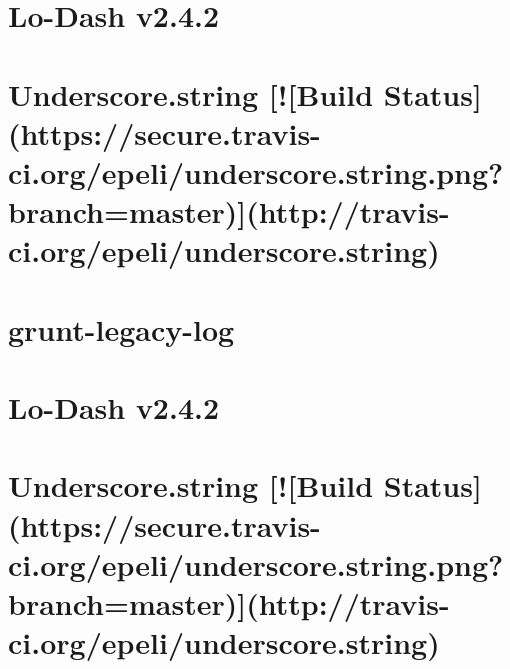 \documentclass[twoside]{book}
\newcommand{\+}{\discretionary{\mbox{\scriptsize$\hookleftarrow$}}{}{}}
\begin{document}
\chapter{Lo-\/\+Dash v2.4.2}
\label{md_app_web_node_modules_grunt-legacy-log_node_modules_lodash__r_e_a_d_m_e}

\chapter{Underscore.\+string \mbox{[}!\mbox{[}Build Status\mbox{]}(https\+://secure.travis-\/ci.org/epeli/underscore.string.\+png?branch=master)\mbox{]}(http\+://travis-\/ci.org/epeli/underscore.string)}
\label{md_app_web_node_modules_grunt-legacy-log_node_modules_underscore_8string__r_e_a_d_m_e}

\chapter{grunt-\/legacy-\/log}
\label{md_app_web_node_modules_grunt-legacy-log__r_e_a_d_m_e}

\chapter{Lo-\/\+Dash v2.4.2}
\label{md_app_web_node_modules_grunt-legacy-log-utils_node_modules_lodash__r_e_a_d_m_e}

\chapter{Underscore.\+string \mbox{[}!\mbox{[}Build Status\mbox{]}(https\+://secure.travis-\/ci.org/epeli/underscore.string.\+png?branch=master)\mbox{]}(http\+://travis-\/ci.org/epeli/underscore.string)}
\label{md_app_web_node_modules_grunt-legacy-log-utils_node_modules_underscore_8string__r_e_a_d_m_e}

\end{document}
